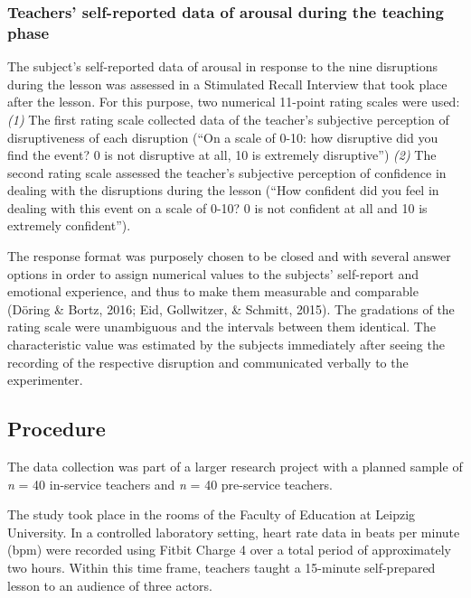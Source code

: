 \documentclass[
  man,floatsintext]{apa6}
\begin{document}
\hypertarget{teachers-self-reported-data-of-arousal-during-the-teaching-phase}{%
\subsubsection{Teachers' self-reported data of arousal during the teaching phase}\label{teachers-self-reported-data-of-arousal-during-the-teaching-phase}}

The subject's self-reported data of arousal in response to the nine disruptions during the lesson was assessed in a Stimulated Recall Interview that took place after the lesson. For this purpose, two numerical 11-point rating scales were used: \emph{(1)} The first rating scale collected data of the teacher's subjective perception of disruptiveness of each disruption (``On a scale of 0-10: how disruptive did you find the event? 0 is not disruptive at all, 10 is extremely disruptive'') \emph{(2)} The second rating scale assessed the teacher's subjective perception of confidence in dealing with the disruptions during the lesson (``How confident did you feel in dealing with this event on a scale of 0-10? 0 is not confident at all and 10 is extremely confident'').

The response format was purposely chosen to be closed and with several answer options in order to assign numerical values to the subjects' self-report and emotional experience, and thus to make them measurable and comparable (Döring \& Bortz, 2016; Eid, Gollwitzer, \& Schmitt, 2015). The gradations of the rating scale were unambiguous and the intervals between them identical. The characteristic value was estimated by the subjects immediately after seeing the recording of the respective disruption and communicated verbally to the experimenter.

\hypertarget{procedure}{%
\subsection{Procedure}\label{procedure}}

The data collection was part of a larger research project with a planned sample of \emph{n} = 40 in-service teachers and \emph{n} = 40 pre-service teachers.

The study took place in the rooms of the Faculty of Education at Leipzig University. In a controlled laboratory setting, heart rate data in beats per minute (bpm) were recorded using Fitbit Charge 4 over a total period of approximately two hours. Within this time frame, teachers taught a 15-minute self-prepared lesson to an audience of three actors.
\end{document}
